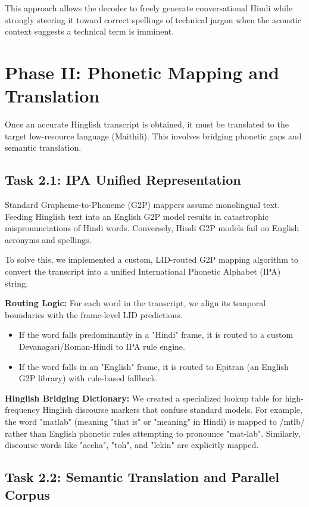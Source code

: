\documentclass[conference]{IEEEtran}
\begin{document}
This approach allows the decoder to freely generate conversational Hindi while strongly steering it toward correct spellings of technical jargon when the acoustic context suggests a technical term is imminent.

\section{Phase II: Phonetic Mapping and Translation}

Once an accurate Hinglish transcript is obtained, it must be translated to the target low-resource language (Maithili). This involves bridging phonetic gaps and semantic translation.

\subsection{Task 2.1: IPA Unified Representation}

Standard Grapheme-to-Phoneme (G2P) mappers assume monolingual text. Feeding Hinglish text into an English G2P model results in catastrophic mispronunciations of Hindi words. Conversely, Hindi G2P models fail on English acronyms and spellings.

To solve this, we implemented a custom, LID-routed G2P mapping algorithm to convert the transcript into a unified International Phonetic Alphabet (IPA) string.

\textbf{Routing Logic:} For each word in the transcript, we align its temporal boundaries with the frame-level LID predictions. 
\begin{itemize}
    \item If the word falls predominantly in a "Hindi" frame, it is routed to a custom Devanagari/Roman-Hindi to IPA rule engine.
    \item If the word falls in an "English" frame, it is routed to Epitran (an English G2P library) with rule-based fallback.
\end{itemize}

\textbf{Hinglish Bridging Dictionary:} We created a specialized lookup table for high-frequency Hinglish discourse markers that confuse standard models. For example, the word "matlab" (meaning "that is" or "meaning" in Hindi) is mapped to /m\textschwa tl\textschwa b/ rather than English phonetic rules attempting to pronounce "mat-lab". Similarly, discourse words like "accha", "toh", and "lekin" are explicitly mapped.

\subsection{Task 2.2: Semantic Translation and Parallel Corpus}
\end{document}
